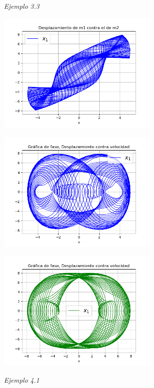 \documentclass[a4paper]{article}
\begin{document}
\textit{Ejemplo 3.3}

\begin{center}
\includegraphics[height=6cm]{recta3-3.png}

\includegraphics[height=6cm]{circulo3-3-1.png}

\includegraphics[height=6cm]{circulo3-3-2.png}
\end{center}

\textit{Ejemplo 4.1}
\end{document}
